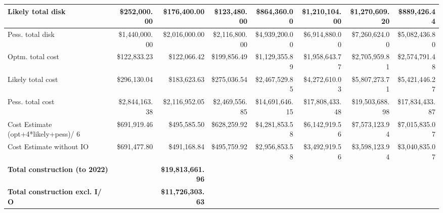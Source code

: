 \begin{longtable} { |p{}  |r  |r  |r  |r  |r  |r  |r |}
{Likely total disk}&{\$252,000.00}&{\$176,400.00}&{\$123,480.00}&{\$864,360.00}&{\$1,210,104.00}&{\$1,270,609.20}&{\$889,426.44} \\ \hline
{Pess. total disk}&{\$1,440,000.00}&{\$2,016,000.00}&{\$2,116,800.00}&{\$4,939,200.00}&{\$6,914,880.00}&{\$7,260,624.00}&{\$5,082,436.80} \\ \hline
{Optm. total cost}&{\$122,833.23}&{\$122,066.42}&{\$199,856.49}&{\$1,129,355.89}&{\$1,958,643.77}&{\$2,705,959.81}&{\$2,574,791.48} \\ \hline
{Likely total cost}&{\$296,130.04}&{\$183,623.63}&{\$275,036.54}&{\$2,467,529.85}&{\$4,272,610.03}&{\$5,807,273.71}&{\$5,421,446.27} \\ \hline
{Pess. total cost}&{\$2,844,163.38}&{\$2,116,952.05}&{\$2,469,556.85}&{\$14,691,646.15}&{\$17,808,433.48}&{\$19,503,688.98}&{\$17,834,433.87} \\ \hline
{Cost Estimate (opt+4*likely+pess)/ 6}&{\$691,919.46}&{\$495,585.50}&{\$628,259.92}&{\$4,281,853.58}&{\$6,142,919.56}&{\$7,573,123.94}&{\$7,015,835.07} \\ \hline
{Cost Estimate without IO}&{\$691,477.80}&{\$491,168.84}&{\$495,759.92}&{\$2,956,853.58}&{\$3,492,919.56}&{\$3,598,123.94}&{\$3,040,835.07} \\ \hline
\textbf{Total construction (to 2022)}&\textbf{}&\textbf{\$19,813,661.96}&&&&& \\ \hline
\textbf{Total construction excl. I/ O}&\textbf{}&\textbf{\$11,726,303.63}&&&&& \\ \hline
\end{longtable} \normalsize
